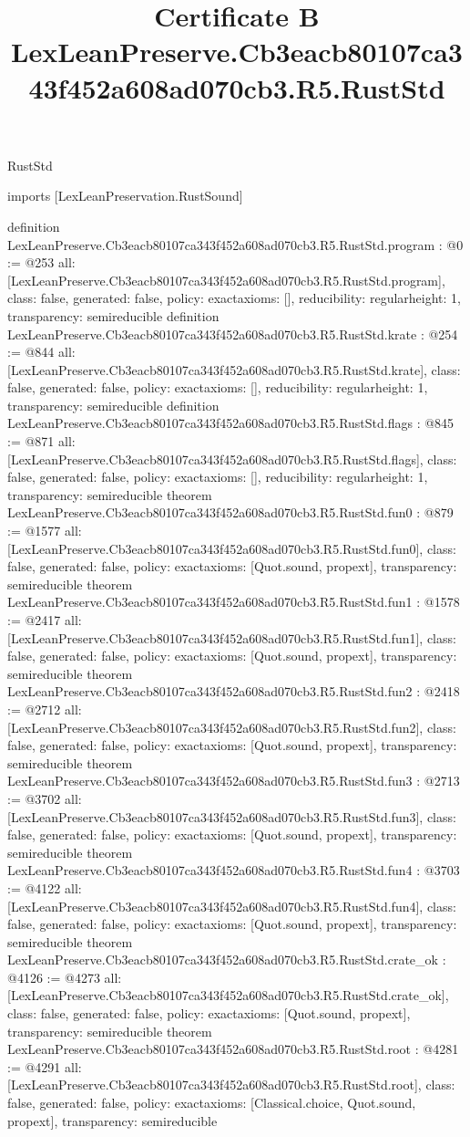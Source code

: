 \begin{lexlean}{RustStd}
\title{Certificate B LexLeanPreserve.Cb3eacb80107ca343f452a608ad070cb3.R5.RustStd}
\begin{coremodule}
imports [LexLeanPreservation.RustSound]

definition LexLeanPreserve.Cb3eacb80107ca343f452a608ad070cb3.R5.RustStd.program : @0 := @253 {
  all: [LexLeanPreserve.Cb3eacb80107ca343f452a608ad070cb3.R5.RustStd.program],
  class: false,
  generated: false,
  policy: exact{axioms: []},
  reducibility: regular{height: 1},
  transparency: semireducible
}
definition LexLeanPreserve.Cb3eacb80107ca343f452a608ad070cb3.R5.RustStd.krate : @254 := @844 {
  all: [LexLeanPreserve.Cb3eacb80107ca343f452a608ad070cb3.R5.RustStd.krate],
  class: false,
  generated: false,
  policy: exact{axioms: []},
  reducibility: regular{height: 1},
  transparency: semireducible
}
definition LexLeanPreserve.Cb3eacb80107ca343f452a608ad070cb3.R5.RustStd.flags : @845 := @871 {
  all: [LexLeanPreserve.Cb3eacb80107ca343f452a608ad070cb3.R5.RustStd.flags],
  class: false,
  generated: false,
  policy: exact{axioms: []},
  reducibility: regular{height: 1},
  transparency: semireducible
}
theorem LexLeanPreserve.Cb3eacb80107ca343f452a608ad070cb3.R5.RustStd.fun0 : @879 := @1577 {
  all: [LexLeanPreserve.Cb3eacb80107ca343f452a608ad070cb3.R5.RustStd.fun0],
  class: false,
  generated: false,
  policy: exact{axioms: [Quot.sound, propext]},
  transparency: semireducible
}
theorem LexLeanPreserve.Cb3eacb80107ca343f452a608ad070cb3.R5.RustStd.fun1 : @1578 := @2417 {
  all: [LexLeanPreserve.Cb3eacb80107ca343f452a608ad070cb3.R5.RustStd.fun1],
  class: false,
  generated: false,
  policy: exact{axioms: [Quot.sound, propext]},
  transparency: semireducible
}
theorem LexLeanPreserve.Cb3eacb80107ca343f452a608ad070cb3.R5.RustStd.fun2 : @2418 := @2712 {
  all: [LexLeanPreserve.Cb3eacb80107ca343f452a608ad070cb3.R5.RustStd.fun2],
  class: false,
  generated: false,
  policy: exact{axioms: [Quot.sound, propext]},
  transparency: semireducible
}
theorem LexLeanPreserve.Cb3eacb80107ca343f452a608ad070cb3.R5.RustStd.fun3 : @2713 := @3702 {
  all: [LexLeanPreserve.Cb3eacb80107ca343f452a608ad070cb3.R5.RustStd.fun3],
  class: false,
  generated: false,
  policy: exact{axioms: [Quot.sound, propext]},
  transparency: semireducible
}
theorem LexLeanPreserve.Cb3eacb80107ca343f452a608ad070cb3.R5.RustStd.fun4 : @3703 := @4122 {
  all: [LexLeanPreserve.Cb3eacb80107ca343f452a608ad070cb3.R5.RustStd.fun4],
  class: false,
  generated: false,
  policy: exact{axioms: [Quot.sound, propext]},
  transparency: semireducible
}
theorem LexLeanPreserve.Cb3eacb80107ca343f452a608ad070cb3.R5.RustStd.crate_ok : @4126 := @4273 {
  all: [LexLeanPreserve.Cb3eacb80107ca343f452a608ad070cb3.R5.RustStd.crate_ok],
  class: false,
  generated: false,
  policy: exact{axioms: [Quot.sound, propext]},
  transparency: semireducible
}
theorem LexLeanPreserve.Cb3eacb80107ca343f452a608ad070cb3.R5.RustStd.root : @4281 := @4291 {
  all: [LexLeanPreserve.Cb3eacb80107ca343f452a608ad070cb3.R5.RustStd.root],
  class: false,
  generated: false,
  policy: exact{axioms: [Classical.choice, Quot.sound, propext]},
  transparency: semireducible
}


\end{coremodule}
\end{lexlean}
